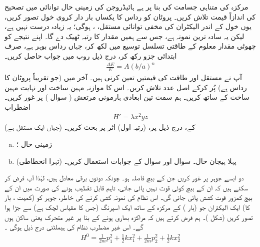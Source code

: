 مرکزہ کی متناہی جسامت کی بنا پر ہے ہائیڈروجن کی  زمینی حال توانائی میں تصحیح کی اندازاً  قیمت تلاش کریں۔ پروٹان کو رداس  کا یکساں بار دار کروی خول  تصور کریں،  یوں خول  کے اندر الیکٹران ‏کی مخفی توانائی مستقل، ،  ہوگی؛  یہ  زیادہ  درست نہیں ہے،  لیکن یہ  سادہ  ترین نمونہ ہے،  جس سے ہمیں   مقدار کا  رتبہ ٹھیک  دے گا۔  اپنے نتیجے  کو  چھوٹی مقدار معلوم  کے  طاقتی تسلسل توسیع میں لکھ کر، جہاں  رداس بوہر ہے،  صرف ابتدائی جزو رکھ کر،  درج ذیل روپ میں  جواب حاصل کریں۔ 
\begin{align*}
\frac{\Delta E}{E} = A (b/a)^n
\end{align*}
آپ نے مستقل  اور طاقت  کی قیمتیں  تعین کرنی ہیں۔ آخر میں  (جو تقریباً پروٹان کا  رداس ہے)  پُر کرکے اصل عدد تلاش کریں۔  اس کا موازنہ مہین ساخت اور نہایت مہین ساخت کے ساتھ کریں۔ 
ہم  سمت  تین ابعادی  ہارمونی مرتعش ( سوال  )  پر غور کریں۔ اضطراب
\begin{align*} 
H' = \lambda x^2 y z
\end{align*}
(جہاں  ایک مستقل ہے) کے،  درج ذیل پر،      (رتبہ اول)  اثر       پر بحث کریں۔ 
\begin{enumerate}[a.]
\item
زمینی حال ؛
\item
(تہرا انحطاطی)   پہلا ہیجان حال۔  سوال   اور سوال    کے جوابات استعمال کریں۔ 
\end{enumerate}
 دو ایسے  جوہر پر غور کریں جن کے بیچ فاصلہ  ہو۔ چونکہ دونوں برقی معادل ہیں،  لہٰذا آپ  فرض کر سکتے ہیں کہ  ان کے بیچ کوئی قوت نہیں پائی جاتی،  تاہم   قابل تقطیب ہونے کی صورت میں  ان کے بیچ کمزور قوت کشش پائی  جائی گی۔ اس نظام کی نمونہ کشی کرنے کی خاطر،   جوہر کو   (کمیت ،   بار   کا) ایک الیکٹران جو    (بار ) کے  مرکزہ   کے ساتھ ایک اسپرنگ (جس کا مقیاس لچک   ہے) سے جڑا ہوا تصور کریں  (شکل  )۔   ہم فرض کرتے ہیں کہ مراکزہ بھاری  ہونے کے بنا پر غیر متحرک یعنی ساکن ہوں گے۔ اس غیر مضطرب نظام کی  ہیملٹنی درج ذیل ہوگی ۔
\begin{align}\label{مساوات_غیر_مضطرب_جوہر_کل_ہیملٹنی}
H^0 = \frac{1}{2m} p_1^2 + \frac{1}{2} k x_1^2 + \frac{1}{2m} p_2^2 + \frac{1}{2} k x_2^2
\end{align}
